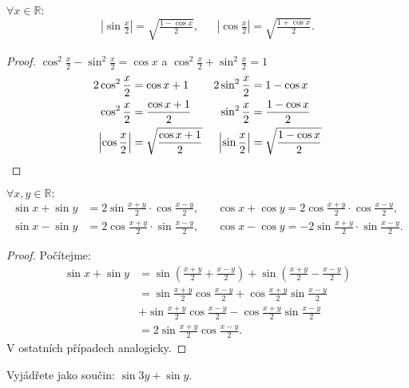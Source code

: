 \begin{veta}
    $\forall x \in \mathbb{R}:$
    \begin{align*}
        \left| \sin \frac{x}{2} \right| = \sqrt{\frac{1-\cos x}{2}}, & & \left| \cos \frac{x}{2}\right| = \sqrt{\frac{1+\cos x}{2}}.
    \end{align*}
\end{veta}

\begin{proof}
  $\cos^2 \frac{x}{2} - \sin^2 \frac{x}{2} = \cos x$ a
  $\cos^2 \frac{x}{2} + \sin^2 \frac{x}{2} =1 $
  \begin{align*}
    2\cos^2 \frac{x}{2}&=\cos x +1 & 2\sin^2 \frac{x}{2} & =1-\cos x \\
    \cos^2 \frac{x}{2}&=\frac{\cos x +1}{2} & \sin^2 \frac{x}{2} & =\frac{1-\cos x }{2} \\
    \left| \cos \frac{x}{2} \right| &= \sqrt{\frac{\cos x +1}{2}} & \left| \sin \frac{x}{2} \right | & = \sqrt{\frac{1-\cos x}{2}}\qedhere
  \end{align*}
\end{proof}

\begin{veta}
  $\forall x,y \in \mathbb{R}:$
  \begin{align*}
    \sin x + \sin y &= 2\sin \frac{x+y}{2}\cdot \cos \frac{x-y}{2},& & \cos x + \cos y = 2 \cos \frac{x + y}{2}\cdot \cos \frac{x - y}{2},\\
    \sin x - \sin y &= 2\cos \frac{x + y}{2}\cdot \sin \frac{x - y}{2},& & \cos x - \cos y =-2\sin \frac{x + y}{2}\cdot \sin \frac{x -y}{2}.
  \end{align*}
\end{veta}

\begin{proof}
    Počítejme:
    \begin{align*}
        \sin x + \sin y & = \sin \left(\frac{x+y}{2}+\frac{x-y}{2}\right)+ \sin \left(\frac{x+y}{2}-\frac{x-y}{2}\right ) \\
        & = \sin \frac{x+y}{2} \cos\frac{x-y}{2} + \cos\frac{x+y}{2} \sin \frac{x-y}{2} \\
        & + \sin \frac{x+y}{2} \cos\frac{x-y}{2} -  \cos\frac{x+y}{2} \sin \frac{x-y}{2}\\
        & = 2\sin \frac{x+y}{2} \cos\frac{x-y}{2}.
    \end{align*}
  V ostatních případech analogicky.
\end{proof}

\begin{priklad}
Vyjádřete jako součin: $\sin 3y+\sin y.$
\end{priklad}

